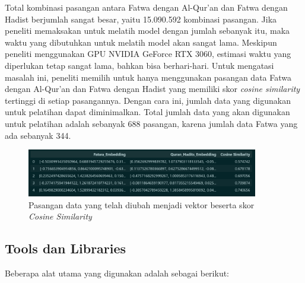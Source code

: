 \documentclass[12pt,a4paper]{article}
\begin{document}
Total kombinasi pasangan antara Fatwa dengan Al-Qur'an dan Fatwa dengan Hadist berjumlah sangat besar, yaitu 15.090.592 kombinasi pasangan. Jika peneliti memaksakan untuk melatih model dengan jumlah sebanyak itu, maka waktu yang dibutuhkan untuk melatih model akan sangat lama. Meskipun peneliti menggunakan GPU NVIDIA GeForce RTX 3060, estimasi waktu yang diperlukan tetap sangat lama, bahkan bisa berhari-hari. Untuk mengatasi masalah ini, peneliti memilih untuk hanya menggunakan pasangan data Fatwa dengan Al-Qur'an dan Fatwa dengan Hadist yang memiliki skor \textit{cosine similarity} tertinggi di setiap pasangannya. Dengan cara ini, jumlah data yang digunakan untuk pelatihan dapat diminimalkan. Total jumlah data yang akan digunakan untuk pelatihan adalah sebanyak 688 pasangan, karena jumlah data Fatwa yang ada sebanyak 344.

\begin{figure}[H]
    \centering
    \includegraphics[width=0.9\textwidth]{images/data_embedded.png}
    \caption{Pasangan data yang telah diubah menjadi vektor beserta skor \textit{Cosine Similarity}}
    \label{fig:bert}
\end{figure}

\subsection{Tools dan Libraries}
Beberapa alat utama yang digunakan adalah sebagai berikut:
\end{document}
